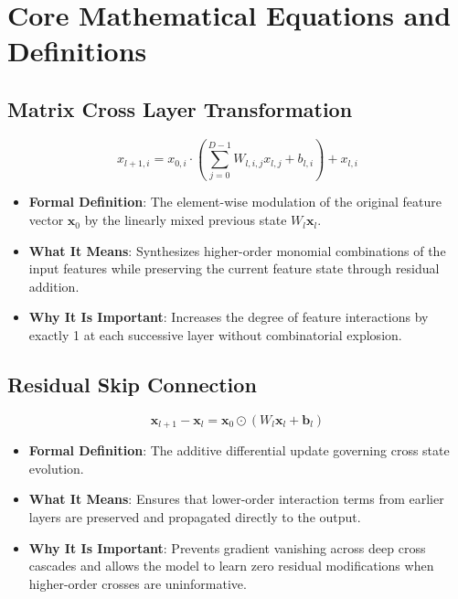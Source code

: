 \documentclass[11pt,a4paper]{article}
\theoremstyle{definition}
\begin{document}
\section{Core Mathematical Equations and Definitions}

\subsection{Matrix Cross Layer Transformation}
{\boldmath
\begin{equation}
x_{l+1, i} = x_{0, i} \cdot \left( \sum_{j=0}^{D-1} W_{l, i, j} x_{l, j} + b_{l, i} \right) + x_{l, i}
\end{equation}
}
\begin{itemize}
    \item \textbf{Formal Definition}: The element-wise modulation of the original feature vector $\mathbf{x}_0$ by the linearly mixed previous state $W_l \mathbf{x}_l$.
    \item \textbf{What It Means}: Synthesizes higher-order monomial combinations of the input features while preserving the current feature state through residual addition.
    \item \textbf{Why It Is Important}: Increases the degree of feature interactions by exactly 1 at each successive layer without combinatorial explosion.
\end{itemize}

\subsection{Residual Skip Connection}
{\boldmath
\begin{equation}
\mathbf{x}_{l+1} - \mathbf{x}_l = \mathbf{x}_0 \odot (W_l \mathbf{x}_l + \mathbf{b}_l)
\end{equation}
}
\begin{itemize}
    \item \textbf{Formal Definition}: The additive differential update governing cross state evolution.
    \item \textbf{What It Means}: Ensures that lower-order interaction terms from earlier layers are preserved and propagated directly to the output.
    \item \textbf{Why It Is Important}: Prevents gradient vanishing across deep cross cascades and allows the model to learn zero residual modifications when higher-order crosses are uninformative.
\end{itemize}
\end{document}
